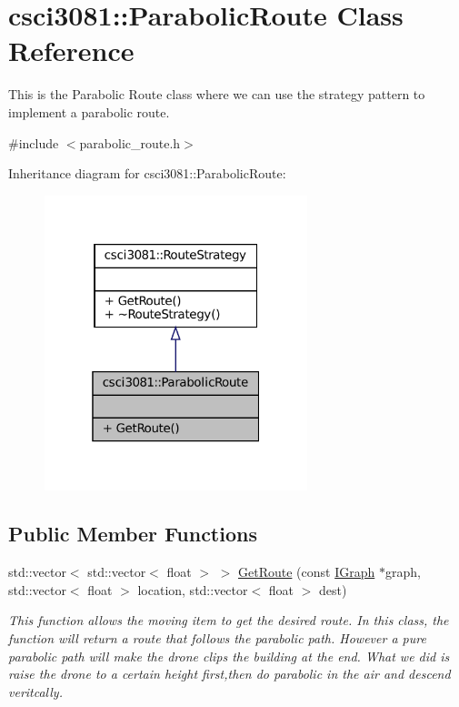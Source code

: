 \hypertarget{classcsci3081_1_1ParabolicRoute}{}\section{csci3081\+:\+:Parabolic\+Route Class Reference}
\label{classcsci3081_1_1ParabolicRoute}


This is the Parabolic Route class where we can use the strategy pattern to implement a parabolic route.  




{\ttfamily \#include $<$parabolic\+\_\+route.\+h$>$}



Inheritance diagram for csci3081\+:\+:Parabolic\+Route\+:
\nopagebreak
\begin{figure}[H]
\begin{center}
\leavevmode
\includegraphics[width=217pt]{classcsci3081_1_1ParabolicRoute__inherit__graph}
\end{center}
\end{figure}
\subsection*{Public Member Functions}
\begin{DoxyCompactItemize}
\item 
std\+::vector$<$ std\+::vector$<$ float $>$ $>$ \hyperlink{classcsci3081_1_1ParabolicRoute_adbafff4df041bd49c060578216cb77fc}{Get\+Route} (const \hyperlink{classentity__project_1_1IGraph}{I\+Graph} $\ast$graph, std\+::vector$<$ float $>$ location, std\+::vector$<$ float $>$ dest)
\begin{DoxyCompactList}\small\item\em This function allows the moving item to get the desired route. In this class, the function will return a route that follows the parabolic path. However a pure parabolic path will make the drone clips the building at the end. What we did is raise the drone to a certain height first,then do parabolic in the air and descend veritcally. \end{DoxyCompactList}\end{DoxyCompactItemize}


